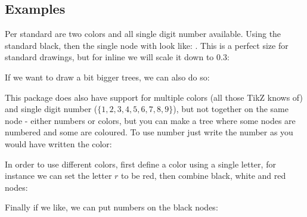 \documentclass[11pt,a4paper]{article}
\begin{document}
\subsection{Examples}
Per standard are two colors and all single digit number available. Using the standard black, then the single node with look like: . This is a perfect size for standard drawings, but for inline we will scale it down to 0.3:   

If we want to draw a bit bigger trees, we can also do so:

\begin{center}
     
\end{center}

This package does also have support for multiple colors (all those TikZ knows of) and single digit number ($\{1,2,3,4,5,6,7,8,9\}$), but not together on the same node - either numbers or colors, but you can make a tree where some nodes are numbered and some are coloured. To use number just write the number as you would have written the color:

\begin{center}
     
\end{center}

In order to use different colors, first define a color using a single letter, for instance we can set the letter $r$ to be red,  then combine black, white and red nodes:

\begin{center}
      
\end{center}

Finally if we like, we can put numbers on the black nodes:
\begin{center}
      
\end{center}
\end{document}
